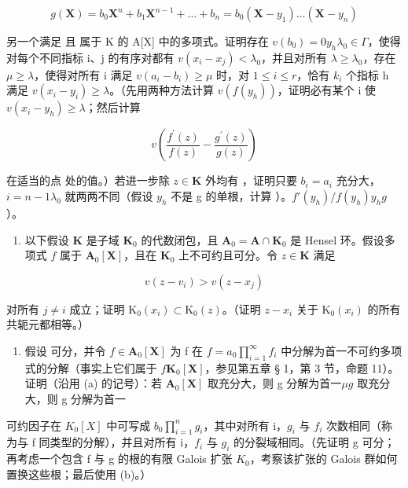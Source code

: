 \[
g (\mathbf {X}) = b _ {0} \mathbf {X} ^ {n} + b _ {1} \mathbf {X} ^ {n - 1} + \dots + b _ {n} = b _ {0} (\mathbf {X} - y _ {1}) \dots (\mathbf {X} - y _ {n})
\]

另一个满足  且  属于 K 的 A{[}X{]} 中的多项式。证明存在 \(v(b_{0}) = 0\)\(y_{h}\)\(\lambda_{0} \in \Gamma\)，使得对每个不同指标 i、j 的有序对都有 \(v(x_{i} - x_{j}) < \lambda_{0}\)，并且对所有 \(\lambda \geqslant \lambda_{0}\)，存在 \(\mu \geqslant \lambda\)，使得对所有 i 满足 \(v(a_{i} - b_{i}) \geqslant \mu\) 时，对 \(1 \leqslant i \leqslant r\)，恰有 \(k_{i}\) 个指标 h 满足 \(v(x_{i} - y_{i}) \geqslant \lambda\)。（先用两种方法计算 \(v(f(y_{h}))\)，证明必有某个 i 使 \(v(x_{i} - y_{h}) \geqslant \lambda\)；然后计算

\[
v \left(\frac {f ^ {\prime} (z)}{f (z)} - \frac {g ^ {\prime} (z)}{g (z)}\right)
\]

在适当的点  处的值。）若进一步除 \(z \in \mathbf{K}\) 外均有 ，证明只要 \(b_{i} = a_{i}\) 充分大，\(i = n - 1\)\(\lambda_0\) 就两两不同（假设 \(y_{h}\) 不是 g 的单根，计算 ）。\(f'(y_h)/f(y_h)\)\(y_{h}\)\(g\)）。

\begin{enumerate}
\def\labelenumi{(\alph{enumi})}
\setcounter{enumi}{1}
\tightlist
\item
  以下假设 \(\mathbf{K}\) 是子域 \(\mathbf{K}_0\) 的代数闭包，且 \(\mathbf{A}_0 = \mathbf{A} \cap \mathbf{K}_0\) 是 Hensel 环。假设多项式 \(f\) 属于 \(\mathbf{A}_0[\mathbf{X}]\)，且在 \(\mathbf{K}_0\) 上不可约且可分。令 \(z \in \mathbf{K}\) 满足
\end{enumerate}

\[
v (z - v _ {i}) > v (z - x _ {j})
\]

对所有 \(j \neq i\) 成立；证明 \(\mathrm{K}_0(x_i) \subset \mathrm{K}_0(z)\)。（证明 \(z - x_i\) 关于 \(\mathrm{K}_0(x_i)\) 的所有共轭元都相等。）

\begin{enumerate}
\def\labelenumi{(\alph{enumi})}
\setcounter{enumi}{2}
\tightlist
\item
  假设  可分，并令 \(f \in \mathbf{A}_0[\mathbf{X}]\) 为 f 在 \(f = a_0 \prod_{i=1}^{\infty} f_i\) 中分解为首一不可约多项式的分解（事实上它们属于 \(f\)\(\mathbf{K}_0[\mathbf{X}]\)，参见第五章 § 1，第 3 节，命题 11）。证明（沿用 (a) 的记号）：若 \(\mathbf{A}_0[\mathbf{X}]\) 取充分大，则 g 分解为首一\(\mu\)\(g\) 取充分大，则 g 分解为首一
\end{enumerate}

可约因子在 \(K_{0}[X]\) 中可写成 \(b_{0}\prod_{i=1}^{n}g_{i}\)，其中对所有 i，\(g_{i}\) 与 \(f_{i}\) 次数相同（称为与 f 同类型的分解），并且对所有 i，\(f_{i}\) 与 \(g_{i}\) 的分裂域相同。（先证明 g 可分；再考虑一个包含 f 与 g 的根的有限 Galois 扩张 \(K_{0}\)，考察该扩张的 Galois 群如何置换这些根；最后使用 (b)。）

